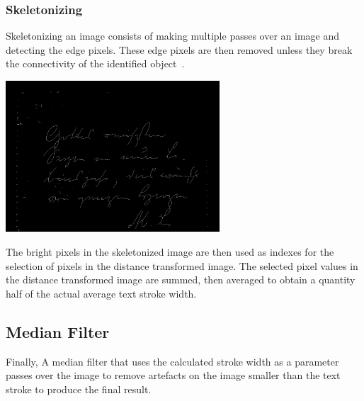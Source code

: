 \documentclass[a4paper]{article}
\begin{document}
\begin{multicols}{2}
    \subsubsection{Skeletonizing}
    Skeletonizing an image consists of making multiple passes over an image and detecting the edge pixels. These edge pixels are then removed unless they break the connectivity of the identified object~\cite{scikit-image}.

    \noindent
    \begin{minipage}{\linewidth}
        \centering
        \includegraphics[width=8cm]{skeletonized.png}
        \label{fig:6}
    \end{minipage}

    The bright pixels in the skeletonized image are then used as indexes for the selection of pixels in the distance transformed image. The selected pixel values in the distance transformed image are summed, then averaged to obtain a quantity half of the actual average text stroke width.

    \subsection{Median Filter}
    Finally, A median filter that uses the calculated stroke width as a parameter passes over the image to remove artefacts on the image smaller than the text stroke to produce the final result.


\end{multicols}
\end{document}
